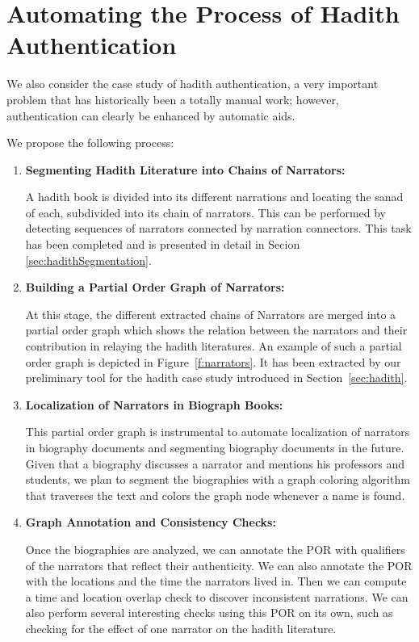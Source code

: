 \documentclass[a4,12pt]{report}
\begin{document}
\section{Automating the Process of Hadith Authentication}

We also consider the case study of hadith authentication, a very important problem
that has historically been a totally manual work; however, authentication can clearly be 
enhanced by automatic aids.

We propose the following process:
\begin{enumerate}
\item \textbf{Segmenting Hadith Literature into Chains of Narrators:}

	A hadith book is divided into its different narrations and locating the sanad of each,
	subdivided into its chain of narrators. This can be performed by detecting sequences of narrators
	connected by narration connectors. This task has been completed and is presented in detail in Secion~
	\ref{sec:hadithSegmentation}.
\item \textbf{Building a Partial Order Graph of Narrators:}

	At this stage, the different extracted chains of Narrators are merged into a 
	partial order graph which shows the relation
	between the narrators and their contribution in relaying the hadith literatures. An example of such a 
	partial order graph
	is depicted in Figure~\ref{f:narrators}. 
	It has been extracted by our preliminary tool for the hadith case study introduced in Section~\ref{sec:hadith}.
	
\item \textbf{Localization of Narrators in Biograph Books:}

	This partial order graph is instrumental to automate
	localization of narrators in biography documents and
	segmenting biography documents in the future.
	Given that a biography discusses a narrator 
	and mentions his professors and students,
	we plan to segment the biographies with a graph 
	coloring algorithm
	that traverses the text and colors the graph node whenever
	a name is found. 
	
\item \textbf{Graph Annotation and Consistency Checks:}

	Once the biographies are analyzed, we can annotate
	the POR with qualifiers of the narrators that reflect
	their authenticity. 
	We can also annotate the POR with the locations and 
	the time the narrators lived in. 
	Then we can compute a time and location overlap
	check to discover inconsistent narrations.
	We can also perform several interesting checks using 
	this POR on its own, such as checking for the effect of
	one narrator on the hadith literature.
\end{enumerate}
\end{document}

